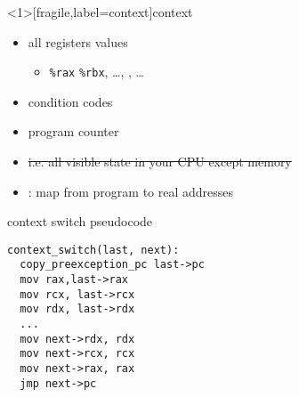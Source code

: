 \begin{frame}<1>[fragile,label=context]{context}
\begin{itemize}
\item all registers values
    \begin{itemize}
        \item \lstinline|%rax| \lstinline|%rbx|, \ldots, , \ldots
    \end{itemize}
\item condition codes
\item program counter
\item \sout<2->{i.e. all visible state in your CPU except memory}
\item<2-> : map from program to real addresses
\end{itemize}
\end{frame}

\begin{frame}[fragile,label=ctxtSwitchPseudo]{context switch pseudocode}
\begin{lstlisting}
context_switch(last, next):
  copy_preexception_pc last->pc
  mov rax,last->rax 
  mov rcx, last->rcx 
  mov rdx, last->rdx
  ...
  mov next->rdx, rdx
  mov next->rcx, rcx
  mov next->rax, rax
  jmp next->pc
\end{lstlisting}
\end{frame}

\newsavebox{\aContext}
\newsavebox{\bContext}


